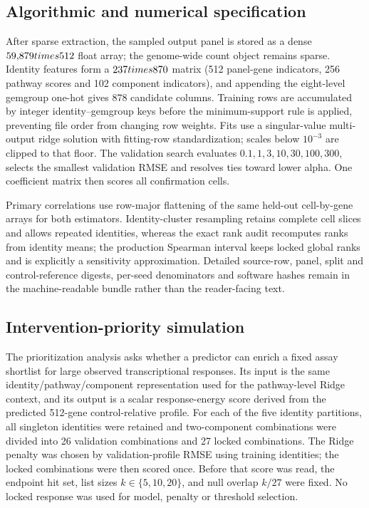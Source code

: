 \documentclass[10pt]{article}
\begin{document}
\subsection{Algorithmic and numerical specification}
After sparse extraction, the sampled output panel is stored as a dense $59{,}879\\times512$ float array; the genome-wide count object remains sparse. Identity features form a $237\\times870$ matrix (512 panel-gene indicators, 256 pathway scores and 102 component indicators), and appending the eight-level gemgroup one-hot gives 878 candidate columns. Training rows are accumulated by integer identity--gemgroup keys before the minimum-support rule is applied, preventing file order from changing row weights. Fits use a singular-value multi-output ridge solution with fitting-row standardization; scales below $10^{-3}$ are clipped to that floor. The validation search evaluates $0.1,1,3,10,30,100,300$, selects the smallest validation RMSE and resolves ties toward lower alpha. One coefficient matrix then scores all confirmation cells.

Primary correlations use row-major flattening of the same held-out cell-by-gene arrays for both estimators. Identity-cluster resampling retains complete cell slices and allows repeated identities, whereas the exact rank audit recomputes ranks from identity means; the production Spearman interval keeps locked global ranks and is explicitly a sensitivity approximation. Detailed source-row, panel, split and control-reference digests, per-seed denominators and software hashes remain in the machine-readable bundle rather than the reader-facing text.

\subsection{Intervention-priority simulation}
The prioritization analysis asks whether a predictor can enrich a fixed assay shortlist for large observed transcriptional responses. Its input is the same identity/pathway/component representation used for the pathway-level Ridge context, and its output is a scalar response-energy score derived from the predicted 512-gene control-relative profile. For each of the five identity partitions, all singleton identities were retained and two-component combinations were divided into 26 validation combinations and 27 locked combinations. The Ridge penalty was chosen by validation-profile RMSE using training identities; the locked combinations were then scored once. Before that score was read, the endpoint hit set, list sizes $k\in\{5,10,20\}$, and null overlap $k/27$ were fixed. No locked response was used for model, penalty or threshold selection.
\end{document}
